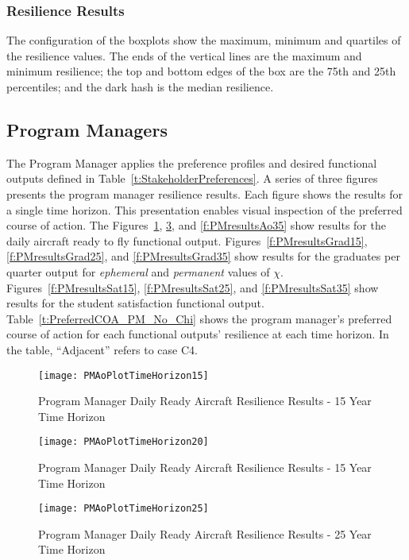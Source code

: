 \subsubsection{Resilience Results}

The configuration of the boxplots show the maximum, minimum and
quartiles of the resilience values. The ends of the vertical lines are
the maximum and minimum resilience; the top and bottom edges  of the box are the
75th and 25th percentiles; and the dark hash is the median resilience.

\subsection{Program Managers}

The Program Manager applies the preference profiles and desired
functional outputs defined in
Table~\ref{t:StakeholderPreferences}. A series of three figures presents
the program manager resilience results. Each figure shows the results
for a single time horizon. This presentation enables visual inspection
of the preferred course of action.  The Figures~\ref{f:PMresultsAo15},
\ref{f:PMresultsAo25}, and \ref{f:PMresultsAo35} show results for
the daily aircraft ready to fly functional
output. Figures~\ref{f:PMresultsGrad15},
\ref{f:PMresultsGrad25}, and \ref{f:PMresultsGrad35} show results for
the graduates per quarter output for \emph{ephemeral} and
\emph{permanent} values of $\chi$. Figures~\ref{f:PMresultsSat15},
\ref{f:PMresultsSat25}, and \ref{f:PMresultsSat35} show results for
the student satisfaction functional output. Table~\ref{t:PreferredCOA_PM_No_Chi} shows the program
manager's preferred course of action for each 
functional outputs' resilience at each time horizon. In the table,
``Adjacent'' refers to case C4.
\begin{figure}[h]
  \centering\texttt{[image: PMAoPlotTimeHorizon15]}
  \caption{Program Manager Daily Ready Aircraft Resilience Results - 15 Year Time Horizon}
  \label{f:PMresultsAo15}
\end{figure}

\begin{figure}[h]
  \centering\texttt{[image: PMAoPlotTimeHorizon20]}
  \caption{Program Manager Daily Ready Aircraft Resilience Results - 15 Year Time Horizon}
  \label{f:PMresultsAo20}
\end{figure}

\begin{figure}[h]
  \centering\texttt{[image: PMAoPlotTimeHorizon25]}
  \caption{Program Manager Daily Ready Aircraft Resilience Results - 25 Year Time Horizon}
  \label{f:PMresultsAo25}
\end{figure}

